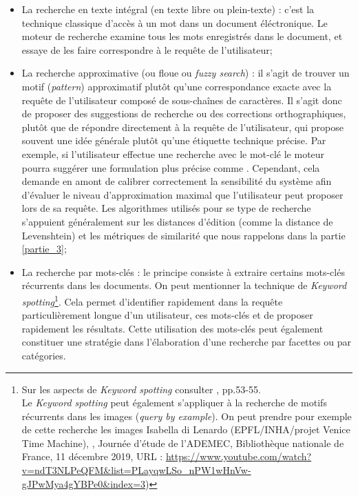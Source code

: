 \bigskip
\begin{itemize}
    \item La recherche en texte intégral (en texte libre ou plein-texte) : c'est la technique classique d'accès à un mot dans un document éléctronique. Le moteur de recherche examine tous les mots enregistrés dans le document, et essaye de les faire correspondre à le requête de l'utilisateur;\\
    \item La recherche approximative (ou floue ou \textit{fuzzy search}) : il s'agit de trouver un motif (\textit{pattern}) approximatif plutôt qu'une correspondance exacte avec la requête de l'utilisateur composé de sous-chaînes de caractères. Il s'agit donc de proposer des suggestions de recherche ou des corrections orthographiques, plutôt que de répondre directement à la requête de l'utilisateur, qui propose souvent une idée générale plutôt qu'une étiquette technique précise. 
    Par exemple, si l'utilisateur effectue une recherche avec le mot-clé  le moteur pourra suggérer une formulation plus précise comme . Cependant, cela demande en amont de calibrer correctement la sensibilité du système afin d'évaluer le niveau d'approximation maximal que l'utilisateur peut proposer lors de sa requête.
    Les algorithmes utilisés pour se type de recherche s'appuient généralement sur les distances d'édition (comme la distance de Levenshtein) et les métriques de similarité que nous rappelons dans la partie \ref{partie_3};\\
    \item La recherche par mots-clés : le principe consiste à extraire certains mots-clés récurrents dans les documents. On peut mentionner la technique de \textit{Keyword spotting}\footnote{Sur les aspects de \textit{Keyword spotting} consulter \cite{bonhomme_defis_2018}, pp.53-55. \\ Le \textit{Keyword spotting} peut également s'appliquer à la recherche de motifs récurrents dans les images (\textit{query by example}). On peut prendre pour exemple de cette recherche les images Isabella di Lenardo (EPFL/INHA/projet Venice Time Machine), , Journée d'étude  de l'ADEMEC, Bibliothèque nationale de France, 11 décembre 2019, URL : \url{https://www.youtube.com/watch?v=ndT3NLPeQFM&list=PLayqwLSo_nPW1wHnVw-gJPwMya4gYBPe0&index=3})}. Cela permet d'identifier rapidement dans la requête particulièrement longue d'un utilisateur, ces mots-clés et de proposer rapidement les résultats. Cette utilisation des mots-clés peut également constituer une stratégie dans l'élaboration d'une recherche par facettes ou par catégories. 
\end{itemize}
